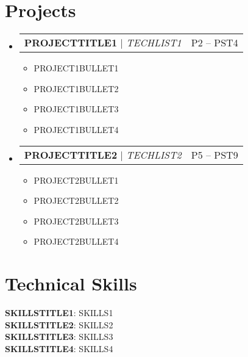 \documentclass[letterpaper,11pt]{article}
\makeatletter
\newcommand{\resumeItem}[1]{
  \item\small{
    {#1 \vspace{-2pt}}
  }
}
\newcommand{\resumeProjectHeading}[2]{
    \item
    \begin{tabular*}{0.97\textwidth}{l@{\extracolsep{\fill}}r}
      \small#1 & #2 \\
    \end{tabular*}\vspace{-7pt}
}
\newcommand{\resumeSubHeadingListStart}{\begin{itemize}[leftmargin=0.15in, label={}]}
\newcommand{\resumeSubHeadingListEnd}{\end{itemize}}
\newcommand{\resumeItemListStart}{\begin{itemize}}
\newcommand{\resumeItemListEnd}{\end{itemize}\vspace{-5pt}}
\makeatother
\begin{document}
\section{Projects}
    \resumeSubHeadingListStart
      \resumeProjectHeading
          {\textbf{PROJECTTITLE1} $|$ \emph{TECHLIST1}}{P2 -- PST4}
          \resumeItemListStart
            \resumeItem{PROJECT1BULLET1}
            \resumeItem{PROJECT1BULLET2}
            \resumeItem{PROJECT1BULLET3}
            \resumeItem{PROJECT1BULLET4}
          \resumeItemListEnd
      \resumeProjectHeading
          {\textbf{PROJECTTITLE2} $|$ \emph{TECHLIST2}}{P5 -- PST9}
          \resumeItemListStart
            \resumeItem{PROJECT2BULLET1}
            \resumeItem{PROJECT2BULLET2}
            \resumeItem{PROJECT2BULLET3}
            \resumeItem{PROJECT2BULLET4}
          \resumeItemListEnd
    \resumeSubHeadingListEnd
%
\section{Technical Skills}
 \begin{itemize}[leftmargin=0.15in, label={}]
    \small{\item{
     \textbf{SKILLSTITLE1}{: SKILLS1} \\
     \textbf{SKILLSTITLE2}{: SKILLS2} \\
     \textbf{SKILLSTITLE3}{: SKILLS3} \\
     \textbf{SKILLSTITLE4}{: SKILLS4}
    }}
 \end{itemize}
\end{document}
